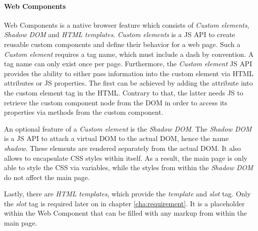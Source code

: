 \paragraph{Web Components}\label{cha:theory_practice_webcomponent}

Web Components is a native browser feature which consists of \textit{Custom elements}, \textit{Shadow \ac{DOM}} and \textit{\ac{HTML} templates}.
\textit{Custom elements} is a \ac{JS} \ac{API} to create reusable custom components and define their behavior for a web page.
Such a \textit{Custom element} requires a tag name, which must include a dash by convention.
A tag name can only exist once per page\footnotemark{}.
Furthermore, the \textit{Custom element} \ac{JS} \ac{API} provides the ability to either pass information into the custom element via \ac{HTML} attributes or \ac{JS} properties.
The first can be achieved by adding the attribute into the custom element tag in the \ac{HTML}.
Contrary to that, the latter needs \ac{JS} to retrieve the custom component node from the \ac{DOM} in order to access its properties via methods from the custom component\footnotemark.

An optional feature of a \textit{Custom element} is the \textit{Shadow \ac{DOM}}.
The \textit{Shadow \ac{DOM}} is a \ac{JS} \ac{API} to attach a virtual \ac{DOM} to the actual \ac{DOM}, hence the name \textit{shadow}.
These elements are rendered separately from the actual \ac{DOM}.
It also allows to encapsulate \ac{CSS} styles within itself.
As a result, the main page is only able to style the \ac{CSS} via variables, while the styles from within the \textit{Shadow \ac{DOM}} do not affect the main page\footnotemark{}.

Lastly, there are \textit{\ac{HTML} templates}, which provide the \textit{template} and \textit{slot} tag.
Only the \textit{slot} tag is required later on in chapter \ref{cha:requirement}.
It is a placeholder within the Web Component that can be filled with any markup from within the main page\footnotemark.






